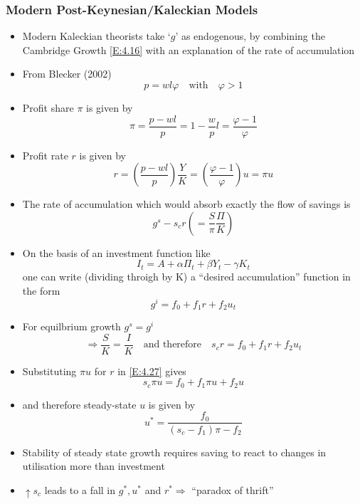 \documentclass[a4paper,twoside]{article}
\numberwithin{equation}{section}
\numberwithin{figure}{section}
\begin{document}
\subsubsection{Modern Post-Keynesian/Kaleckian Models}
	\begin{itemize}
		\item Modern Kaleckian theorists take `\( g \)' as endogenous, by combining the Cambridge Growth \cref{E:4.16} with an explanation of the rate of accumulation
		\item From Blecker (2002)
		\begin{equation}
			p = wl\varphi \quad\text{with}\quad \varphi>1 \label{E:4.21}
		\end{equation}
		\item Profit share \( \pi \) is given by
		\begin{equation}
			\pi = \frac{p-wl}{p} = 1-\frac{w}{p}l = \frac{\varphi-1}{\varphi} \label{E:4.22}
		\end{equation}
		\item Profit rate \( r \) is given by
		\begin{equation}
			r=\left(\frac{p-wl}{p}\right)\frac{Y}{K} = \left( \frac{\varphi-1}{\varphi} \right) u = \pi u \label{E:4.23}
		\end{equation}
		\item The rate of accumulation which would absorb exactly the flow of savings is
		\begin{equation}
			g^s - s_c r \left( =\frac{S}{\pi}\frac{\Pi}{K} \right) \label{E:4.24}
		\end{equation}
		\item On the basis of an investment function like
		\begin{equation}
			I_t = A + \alpha\Pi_t + \beta Y_t - \gamma K_t \label{E:4.25}
		\end{equation}
		one can write (dividing throigh by K) a ``desired accumulation'' function in the form
		\begin{equation}
			g^i = f_0 + f_1r + f_2u_t \label{E:4.26}
		\end{equation}
		\item For equilbrium growth \( g^s = g^i \)
		\begin{equation}
			\Rightarrow \frac{S}{K}=\frac{I}{K} \quad\text{and therefore}\quad s_c r = f_0+f_1r+f_2 u_t \label{E:4.27}
		\end{equation}
		\item Substituting \( \pi u \) for \( r \) in \cref{E:4.27} gives
		\begin{equation}
			s_c\pi u = f_0 + f_1 \pi u + f_2 u \label{E:4.28}
		\end{equation}
		\item and therefore steady-state \( u \) is given by
		\begin{equation}
			u^*=\frac{f_0}{(s_c - f_1)\pi - f_2} \label{E:4.29}
		\end{equation}
		\item Stability of steady state growth requires saving to react to changes in utilisation more than investment
		\item \( \uparrow s_c \) leads to a fall in \( g^*, u^* \) and \( r^* \Rightarrow \) ``paradox of thrift''
	\end{itemize}
\end{document}
